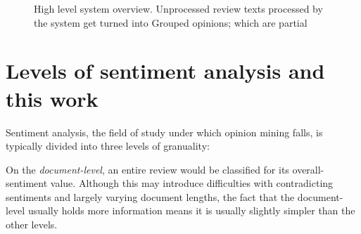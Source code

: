 \documentclass[a4paper,11pt]{kth-mag}
\begin{document}
\begin{figure}[t]
  \centering
  \caption{High level system overview. Unprocessed review texts processed by the system
    get turned into Grouped opinions; which are partial }
  \label{fig:overview}
\end{figure}



\clearpage

\newpage
\section{Levels of sentiment analysis and this work}
Sentiment analysis, the field of study under which opinion mining falls,
is typically divided into three levels of granuality:

On the \emph{document-level}, an entire review would be classified for
its overall-sentiment value\cite[Chapter~1.2]{liu2012sentiment}.
Although this may introduce difficulties with contradicting sentiments
and largely varying document lengths, the fact that the document-level usually holds more information
means it is usually slightly simpler than the other levels.
\end{document}
